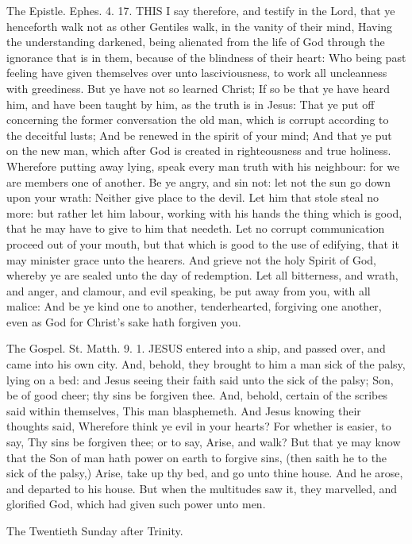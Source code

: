 The Epistle. Ephes. 4. 17.
THIS I say therefore, and testify in the Lord, that ye henceforth walk not as other Gentiles walk, in the vanity of their mind, Having the understanding darkened, being alienated from the life of God through the ignorance that is in them, because of the blindness of their heart: Who being past feeling have given themselves over unto lasciviousness, to work all uncleanness with greediness. But ye have not so learned Christ; If so be that ye have heard him, and have been taught by him, as the truth is in Jesus: That ye put off concerning the former conversation the old man, which is corrupt according to the deceitful lusts; And be renewed in the spirit of your mind; And that ye put on the new man, which after God is created in righteousness and true holiness. Wherefore putting away lying, speak every man truth with his neighbour: for we are members one of another. Be ye angry, and sin not: let not the sun go down upon your wrath: Neither give place to the devil. Let him that stole steal no more: but rather let him labour, working with his hands the thing which is good, that he may have to give to him that needeth. Let no corrupt communication proceed out of your mouth, but that which is good to the use of edifying, that it may minister grace unto the hearers. And grieve not the holy Spirit of God, whereby ye are sealed unto the day of redemption. Let all bitterness, and wrath, and anger, and clamour, and evil speaking, be put away from you, with all malice: And be ye kind one to another, tenderhearted, forgiving one another, even as God for Christ's sake hath forgiven you.


The Gospel. St. Matth. 9. 1.
JESUS entered into a ship, and passed over, and came into his own city. And, behold, they brought to him a man sick of the palsy, lying on a bed: and Jesus seeing their faith said unto the sick of the palsy; Son, be of good cheer; thy sins be forgiven thee. And, behold, certain of the scribes said within themselves, This man blasphemeth. And Jesus knowing their thoughts said, Wherefore think ye evil in your hearts? For whether is easier, to say, Thy sins be forgiven thee; or to say, Arise, and walk? But that ye may know that the Son of man hath power on earth to forgive sins, (then saith he to the sick of the palsy,) Arise, take up thy bed, and go unto thine house. And he arose, and departed to his house. But when the multitudes saw it, they marvelled, and glorified God, which had given such power unto men.


The Twentieth Sunday after Trinity.
\subsection{}


